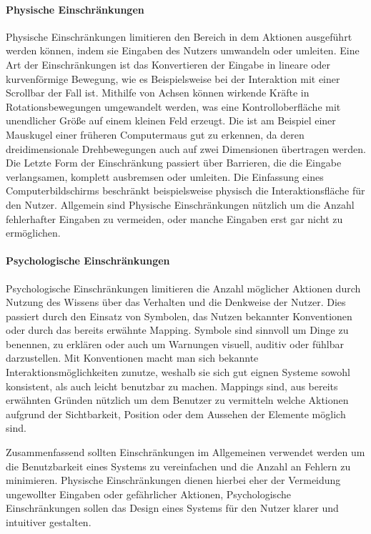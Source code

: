 \paragraph{Physische Einschränkungen}
Physische Einschränkungen limitieren den Bereich in dem Aktionen ausgeführt werden können, indem sie Eingaben des Nutzers umwandeln oder umleiten.
Eine Art der Einschränkungen ist das Konvertieren der Eingabe in lineare oder kurvenförmige Bewegung, wie es Beispielsweise bei der Interaktion mit einer Scrollbar der Fall ist.
Mithilfe von Achsen können wirkende Kräfte in Rotationsbewegungen umgewandelt werden, was eine Kontrolloberfläche mit unendlicher Größe auf einem kleinen Feld erzeugt.
Die ist am Beispiel einer Mauskugel einer früheren Computermaus gut zu erkennen, da deren dreidimensionale Drehbewegungen auch auf zwei Dimensionen übertragen werden.
Die Letzte Form der Einschränkung passiert über Barrieren, die die Eingabe verlangsamen, komplett ausbremsen oder umleiten. Die Einfassung eines Computerbildschirms beschränkt beispielsweise physisch die Interaktionsfläche für den Nutzer.
Allgemein sind Physische Einschränkungen nützlich um die Anzahl fehlerhafter Eingaben zu vermeiden, oder manche Eingaben erst gar nicht zu ermöglichen\cite{Norman.2016}.

\paragraph{Psychologische Einschränkungen}
Psychologische Einschränkungen limitieren die Anzahl möglicher Aktionen durch Nutzung des Wissens über das Verhalten und die Denkweise der Nutzer.
Dies passiert durch den Einsatz von Symbolen, das Nutzen bekannter Konventionen oder durch das bereits erwähnte Mapping.
Symbole sind sinnvoll um Dinge zu benennen, zu erklären oder auch um Warnungen visuell, auditiv oder fühlbar darzustellen.
Mit Konventionen macht man sich bekannte Interaktionsmöglichkeiten zunutze, weshalb sie sich gut eignen Systeme sowohl konsistent, als auch leicht benutzbar zu machen.
Mappings sind, aus bereits erwähnten Gründen nützlich um dem Benutzer zu vermitteln welche Aktionen aufgrund der Sichtbarkeit, Position oder dem Aussehen der Elemente möglich sind\cite{Norman.2016}.

Zusammenfassend sollten Einschränkungen im Allgemeinen verwendet werden um die Benutzbarkeit eines Systems zu vereinfachen und die Anzahl an Fehlern zu minimieren. Physische Einschränkungen dienen hierbei eher der Vermeidung ungewollter Eingaben oder gefährlicher Aktionen, Psychologische Einschränkungen sollen das Design eines Systems für den Nutzer klarer und intuitiver gestalten.

